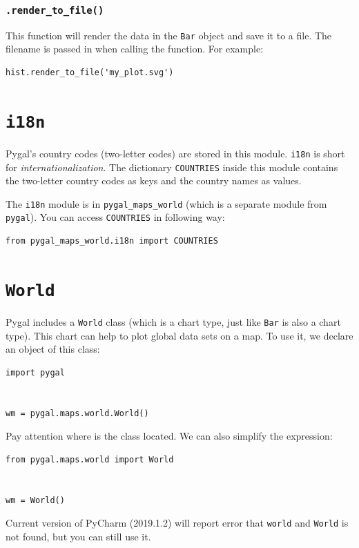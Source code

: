 \documentclass[12pt]{book}
\begin{document}
\subsubsection{\texttt{.render\_to\_file()}}
\label{sec:org25cdd27}
This function will render the data in the \texttt{Bar} object and save it to a file. The filename is passed in when calling the function. For example:
\begin{verbatim}
hist.render_to_file('my_plot.svg')
\end{verbatim}
\section{\texttt{i18n}}
\label{sec:orgd401247}
Pygal's country codes (two-letter codes) are stored in this module. \texttt{i18n} is short for \emph{internationalization}. The dictionary \texttt{COUNTRIES} inside this module contains the two-letter country codes as keys and the country names as values.

The \texttt{i18n} module is in \texttt{pygal\_maps\_world} (which is a separate module from \texttt{pygal}). You can access \texttt{COUNTRIES} in following way:
\begin{verbatim}
from pygal_maps_world.i18n import COUNTRIES
\end{verbatim}
\section{\texttt{World}}
\label{sec:orga1fdff7}
Pygal includes a \texttt{World} class (which is a chart type, just like \texttt{Bar} is also a chart type). This chart can help to plot global data sets on a map. To use it, we declare an object of this class:
\begin{verbatim}
import pygal


wm = pygal.maps.world.World()
\end{verbatim}
Pay attention where is the class located. We can also simplify the expression:
\begin{verbatim}
from pygal.maps.world import World


wm = World()
\end{verbatim}
Current version of PyCharm (2019.1.2) will report error that \texttt{world} and \texttt{World} is not found, but you can still use it.
\end{document}
